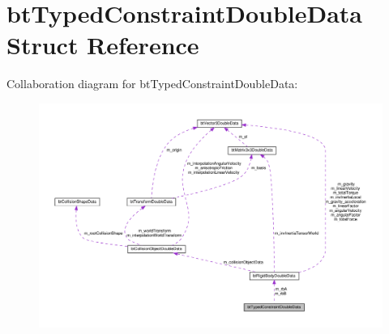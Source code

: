 \hypertarget{structbtTypedConstraintDoubleData}{}\section{bt\+Typed\+Constraint\+Double\+Data Struct Reference}
\label{structbtTypedConstraintDoubleData}


Collaboration diagram for bt\+Typed\+Constraint\+Double\+Data\+:
\nopagebreak
\begin{figure}[H]
\begin{center}
\leavevmode
\includegraphics[width=350pt]{structbtTypedConstraintDoubleData__coll__graph}
\end{center}
\end{figure}
